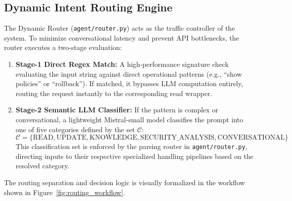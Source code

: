 \subsection{Dynamic Intent Routing Engine}
The Dynamic Router (\texttt{agent/router.py}) acts as the traffic controller of the system. To minimize conversational latency and prevent API bottlenecks, the router executes a two-stage evaluation:
\begin{enumerate}
    \item \textbf{Stage-1 Direct Regex Match:} A high-performance signature check evaluating the input string against direct operational patterns (e.g., ``show policies'' or ``rollback''). If matched, it bypasses LLM computation entirely, routing the request instantly to the corresponding read wrapper.
    \item \textbf{Stage-2 Semantic LLM Classifier:} If the pattern is complex or conversational, a lightweight Mistral-small model classifies the prompt into one of five categories defined by the set $\mathcal{C}$:
    \begin{equation}
        \mathcal{C} = \{\text{READ}, \text{UPDATE}, \text{KNOWLEDGE}, \text{SECURITY\_ANALYSIS}, \text{CONVERSATIONAL}\}
    \end{equation}
    This classification set is enforced by the parsing router in \texttt{agent/router.py}, directing inputs to their respective specialized handling pipelines based on the resolved category.
\end{enumerate}

The routing separation and decision logic is visually formalized in the workflow shown in Figure~\ref{fig:routing_workflow}.

